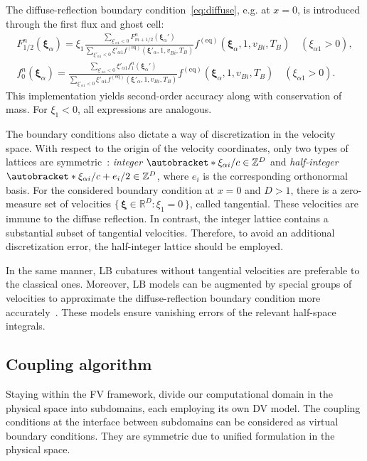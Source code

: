 \documentclass{article}
\newcommand{\Set}[2]{\{\,{#1}:{#2}\,\}}
\DeclarePairedDelimiter\autobracket()       %
\newcommand{\br}[1]{\autobracket*{#1}}
\newcommand{\bxi}{{\boldsymbol{\xi}}}
\newcommand{\bxia}{\bxi_\alpha}
\newcommand{\xiai}{\xi_{\alpha i}}
\newcommand{\equil}[1]{#1^\mathrm{(eq)}}
\begin{document}
The diffuse-reflection boundary condition~\eqref{eq:diffuse}, e.g. at \(x=0\),
is introduced through the first flux and ghost cell:
\begin{gather}
    F_{1/2}^n(\bxia) = \displaystyle\xi_1\frac{\sum_{\xi'_{\alpha1}<0}F_{m+1/2}^n(\bxia')}
        {\sum_{\xi'_{\alpha1}<0}\xi'_{\alpha1}\equil{f}(\bxi'_\alpha,1,v_{Bi},T_B)}
        \equil{f}(\bxi_\alpha, 1, v_{Bi}, T_B) \quad (\xi_{\alpha1}>0), \label{eq:first_flux}\\
    f_0^n(\bxia) = \displaystyle\frac{\sum_{\xi'_{\alpha1}<0}\xi'_{\alpha1}f_1^n(\bxia')}
        {\sum_{\xi'_{\alpha1}<0}\xi'_{\alpha1}\equil{f}(\bxi'_\alpha,1,v_{Bi},T_B)}
        \equil{f}(\bxi_\alpha, 1, v_{Bi}, T_B) \quad (\xi_{\alpha1}>0). \label{eq:first_ghost}
\end{gather}
This implementation yields second-order accuracy along with conservation of mass.
For \(\xi_1<0\), all expressions are analogous.

The boundary conditions also dictate a way of discretization in the velocity space.
With respect to the origin of the velocity coordinates, only two types of lattices are symmetric~\cite{Inamuro1990}:
\emph{integer} \(\br{\xiai/c} \in \mathbb{Z}^D\) and \emph{half-integer} \(\br{\xiai/c + e_i/2} \in \mathbb{Z}^D\),
where \(e_i\) is the corresponding orthonormal basis.
For the considered boundary condition at \(x=0\) and \(D>1\), there is a zero-measure set of velocities
\(\Set{\bxi\in\mathbb{R}^D}{\xi_1=0}\), called tangential.
These velocities are immune to the diffuse reflection.
In contrast, the integer lattice contains a substantial subset of tangential velocities.
Therefore, to avoid an additional discretization error, the half-integer lattice should be employed.

In the same manner, LB cubatures without tangential velocities are preferable to the classical ones.
Moreover, LB models can be augmented by special groups of velocities to approximate
the diffuse-reflection boundary condition more accurately~\cite{Feuchter2016}.
These models ensure vanishing errors of the relevant half-space integrals.

\subsection{Coupling algorithm}\label{sec:coupling}

Staying within the FV framework, divide our computational domain in the physical space
into subdomains, each employing its own DV model.
The coupling conditions at the interface between subdomains can be considered as virtual boundary conditions.
They are symmetric due to unified formulation in the physical space.
\end{document}
